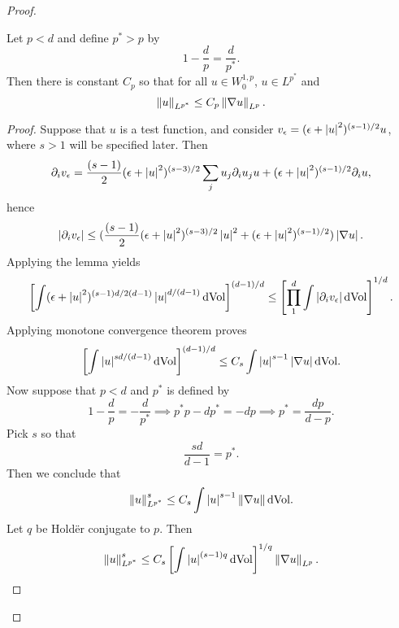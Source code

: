 \documentclass{amsart}
\begin{document}
\begin{proof}
  \begin{claim}
    Let $p<d$ and define $p^{*}>p$ by
    \begin{equation*}
      1-\frac{d}{p}=\frac{d}{p^{*}}.
    \end{equation*}
    Then there is constant $C_{p}$ so that for all $u\in W^{1,p}_{0}$, $u\in L^{p^{*}}$ and
    \begin{equation*}
      \left\lVert u\right\rVert_{L^{p^{*}}}\le C_{p}\left\lVert\nabla u\right\rVert_{L^{p}}.
    \end{equation*}
    \begin{proof}     
  Suppose that $u$ is a test function, and consider $v_{\epsilon}=(\epsilon+\left|u\right|^{2})^{(s-1)/2}u$, where $s>1$ will be specified later. Then
  \begin{equation*}
    \partial_{i}v_{\epsilon}=\frac{(s-1)}{2} (\epsilon+\left|u\right|^{2})^{(s-3)/2}\sum_{j}u_{j}\partial_{i}u_{j} u+(\epsilon+\left|u\right|^{2})^{(s-1)/2}\partial_{i}u,
  \end{equation*}
  hence
  \begin{equation*}
    \left|\partial_{i}v_{\epsilon}\right|\le (\frac{(s-1)}{2}(\epsilon+\left|u\right|^{2})^{(s-3)/2}\left|u\right|^{2}+(\epsilon+\left|u\right|^{2})^{(s-1)/2})\left|\nabla u\right|.
  \end{equation*}
  Applying the lemma yields
  \begin{equation*}
    \left[\int (\epsilon+\left|u\right|^{2})^{(s-1)d/2(d-1)}\left|u\right|^{d/(d-1)}\mathrm{d}\mathrm{Vol}\right]^{(d-1)/d}\le \left[\prod_{1}^{d}\int\left|\partial_{i}v_{\epsilon}\right|\mathrm{d}\mathrm{Vol}\right]^{1/d}.
  \end{equation*}
  Applying monotone convergence theorem proves
  \begin{equation*}    \left[\int\left|u\right|^{sd/(d-1)}\mathrm{d}\mathrm{Vol}\right]^{(d-1)/d}\le C_{s}\int \left|u\right|^{s-1}\left|\nabla u\right|\mathrm{d}\mathrm{Vol}.
  \end{equation*}
  Now suppose that $p<d$ and $p^{*}$ is defined by
  \begin{equation*}
    1-\frac{d}{p}=-\frac{d}{p^{*}}\implies p^{*}p-dp^{*}=-dp\implies p^{*}=\frac{dp}{d-p}.
  \end{equation*}
  Pick $s$ so that
  \begin{equation*}
    \frac{sd}{d-1}=p^{*}.
  \end{equation*}
  Then we conclude that
  \begin{equation*}
    \left\lVert u\right\rVert_{L^{p^{*}}}^{s}\le C_{s}\int \left|u\right|^{s-1}\left\lVert\nabla u\right\rVert\mathrm{dVol}.
  \end{equation*}
  Let $q$ be Hold\"er conjugate to $p$. Then
  \begin{equation*}
    \norm{u}_{L^{p^{*}}}^{s}\le C_{s}\left[\int \abs{u}^{(s-1)q}\dVol\right]^{1/q}\norm{\nabla u}_{L^{p}}.

\end{equation*}
\end{proof}
\end{claim}
\end{proof}
\end{document}
